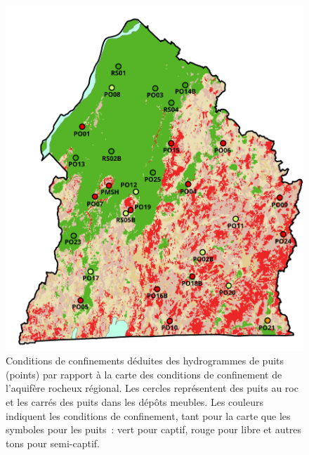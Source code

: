 \documentclass[WHATMANUAL.tex]{subfiles}
\begin{document}
\begin{figure}
\centering
\includegraphics[height=0.85\textheight]{img/CONFINEMENTetPUITS}
\caption[Conditions de confinements déduites des hydrogrammes de puits (points) par rapport à la carte des conditions de confinement de l’aquifère rocheux régional.]{Conditions de confinements déduites des hydrogrammes de puits (points) par rapport à la carte des conditions de confinement de l’aquifère rocheux régional. Les cercles représentent des puits au roc et les carrés des puits dans les dépôts meubles. Les couleurs indiquent les conditions de confinement, tant pour la carte que les symboles pour les puits : vert pour captif, rouge pour libre et autres tons pour semi-captif.}
\label{fig:tab_hydrograph_layout}
\end{figure}
\end{document}
